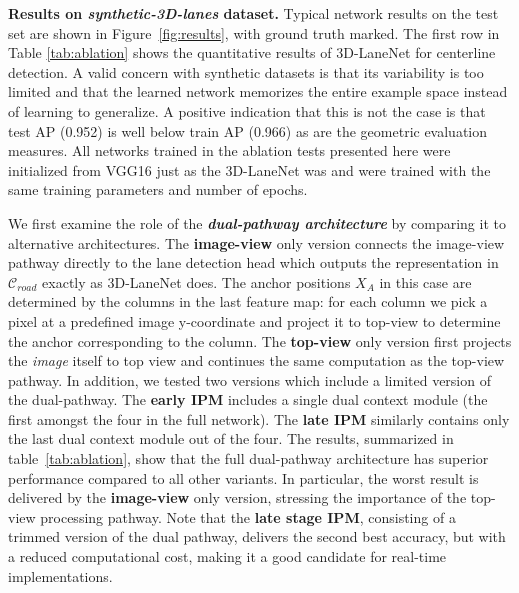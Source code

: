 \documentclass[10pt,twocolumn,letterpaper]{article}
\begin{document}
\textbf{Results on \textit{synthetic-3D-lanes} dataset.} Typical network results on the test set are shown in Figure~\ref{fig:results}, with ground truth marked. The first row in Table \ref{tab:ablation} shows the quantitative results of 3D-LaneNet for centerline detection. A valid concern with synthetic datasets is that its variability is too limited and that the learned network memorizes the entire example space instead of learning to generalize. A positive indication that this is not the case is that test AP (0.952) is well below train AP (0.966) as are the geometric evaluation measures. All networks trained in the ablation tests presented here were initialized from VGG16 just as the 3D-LaneNet was and were trained with the same training parameters and number of epochs.

We first examine the role of the \textit{\textbf{dual-pathway architecture}} by comparing it to alternative architectures. The \textbf{image-view} only version connects the image-view pathway directly to the lane detection head which outputs the representation in $\mathcal{C}_{road}$ exactly as 3D-LaneNet does. The anchor positions $X_A$ in this case are determined by the columns in the last feature map: for each column we pick a pixel at a predefined image y-coordinate and project it to top-view to determine the anchor corresponding to the column. The \textbf{top-view} only version first projects the \textit{image} itself to top view and continues the same computation as the top-view pathway. In addition, we tested two versions which include a limited version of the dual-pathway. The \textbf{early IPM} includes a single dual context module (the first amongst the four in the full network). The \textbf{late IPM} similarly contains only the last dual context module out of the four. The results,  summarized in table~\ref{tab:ablation}, show that the full dual-pathway architecture has superior performance compared to all other variants. In particular, the worst result is delivered by the \textbf{image-view} only version, stressing the importance of the top-view processing pathway. Note that the \textbf{late stage IPM}, consisting of a trimmed version of the dual pathway, delivers the second best accuracy, but with a reduced computational cost, making it a good candidate for real-time implementations.
\end{document}
